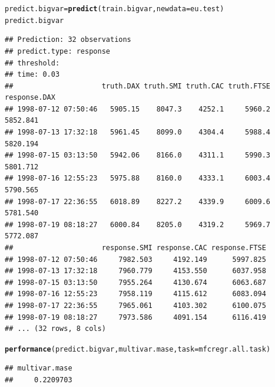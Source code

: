 \documentclass{article}\usepackage[]{graphicx}\usepackage[]{color}
\makeatletter
\newcommand{\hlstd}[1]{\textcolor[rgb]{0.345,0.345,0.345}{#1}}%
\newcommand{\hlkwb}[1]{\textcolor[rgb]{0.69,0.353,0.396}{#1}}%
\newcommand{\hlkwc}[1]{\textcolor[rgb]{0.333,0.667,0.333}{#1}}%
\newcommand{\hlkwd}[1]{\textcolor[rgb]{0.737,0.353,0.396}{\textbf{#1}}}%
\newenvironment{kframe}{%
 \def\at@end@of@kframe{}%
 \ifinner\ifhmode%
  \def\at@end@of@kframe{\end{minipage}}%
  \begin{minipage}{\columnwidth}%
 \fi\fi%
 \def\FrameCommand##1{\hskip\@totalleftmargin \hskip-\fboxsep
 \colorbox{shadecolor}{##1}\hskip-\fboxsep
     \hskip-\linewidth \hskip-\@totalleftmargin \hskip\columnwidth}%
 \MakeFramed {\advance\hsize-\width
   \@totalleftmargin\z@ \linewidth\hsize
   \@setminipage}}%
 {\par\unskip\endMakeFramed%
 \at@end@of@kframe}
\newenvironment{knitrout}{}{} %
\theoremstyle{definition}
\makeatother
\begin{document}
\begin{knitrout}
\color{fgcolor}\begin{kframe}
\begin{alltt}
\hlstd{predict.bigvar} \hlkwb{=} \hlkwd{predict}\hlstd{(train.bigvar,} \hlkwc{newdata} \hlstd{= eu.test)}
\hlstd{predict.bigvar}
\end{alltt}
\begin{verbatim}
## Prediction: 32 observations
## predict.type: response
## threshold: 
## time: 0.03
##                     truth.DAX truth.SMI truth.CAC truth.FTSE response.DAX
## 1998-07-12 07:50:46   5905.15    8047.3    4252.1     5960.2     5852.841
## 1998-07-13 17:32:18   5961.45    8099.0    4304.4     5988.4     5820.194
## 1998-07-15 03:13:50   5942.06    8166.0    4311.1     5990.3     5801.712
## 1998-07-16 12:55:23   5975.88    8160.0    4333.1     6003.4     5790.565
## 1998-07-17 22:36:55   6018.89    8227.2    4339.9     6009.6     5781.540
## 1998-07-19 08:18:27   6000.84    8205.0    4319.2     5969.7     5772.087
##                     response.SMI response.CAC response.FTSE
## 1998-07-12 07:50:46     7982.503     4192.149      5997.825
## 1998-07-13 17:32:18     7960.779     4153.550      6037.958
## 1998-07-15 03:13:50     7955.264     4130.674      6063.687
## 1998-07-16 12:55:23     7958.119     4115.612      6083.094
## 1998-07-17 22:36:55     7965.061     4103.302      6100.075
## 1998-07-19 08:18:27     7973.586     4091.154      6116.419
## ... (32 rows, 8 cols)
\end{verbatim}
\begin{alltt}
\hlkwd{performance}\hlstd{(predict.bigvar, multivar.mase,} \hlkwc{task} \hlstd{= mfcregr.all.task)}
\end{alltt}
\begin{verbatim}
## multivar.mase 
##     0.2209703
\end{verbatim}
\end{kframe}
\end{knitrout}
\end{document}
